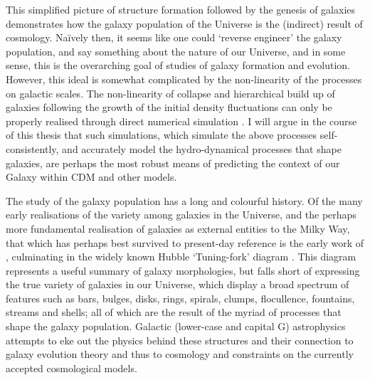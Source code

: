 This simplified picture of structure formation followed by the genesis of galaxies demonstrates how the galaxy population of the Universe is the (indirect) result of cosmology. Na\"ively then, it seems like one could `reverse engineer' the galaxy population, and say something about the nature of our Universe, and in some sense, this is the overarching goal of studies of galaxy formation and evolution. However, this ideal is somewhat complicated by the non-linearity of the processes on galactic scales. The non-linearity of collapse and hierarchical build up of galaxies following the growth of the initial density fluctuations can only be properly realised through direct numerical simulation \citep[e.g.][]{2005Natur.435..629S}. I will argue in the course of this thesis that such simulations, which simulate the above processes self-consistently, and accurately model the hydro-dynamical processes that shape galaxies, are perhaps the most robust means of predicting the context of our Galaxy within CDM and other models.

The study of the galaxy population has a long and colourful history. Of the many early realisations of the variety among galaxies in the Universe, and the perhaps more fundamental realisation of galaxies as external entities to the Milky Way, that which has perhaps best survived to present-day reference is the early work of \citet{1926ApJ....64..321H}, culminating in the widely known Hubble `Tuning-fork' diagram \citep[e.g.][]{1936rene.book.....H,1961hag..book.....S}. This diagram represents a useful summary of galaxy morphologies, but falls short of expressing the true variety of galaxies in our Universe, which display a broad spectrum of features such as bars, bulges, disks, rings, spirals, clumps, flocullence, fountains, streams and shells; all of which are the result of the myriad of processes that shape the galaxy population. Galactic (lower-case and capital G) astrophysics attempts to eke out the physics behind these structures and their connection to galaxy evolution theory and thus to cosmology and constraints on the currently accepted cosmological models. 

